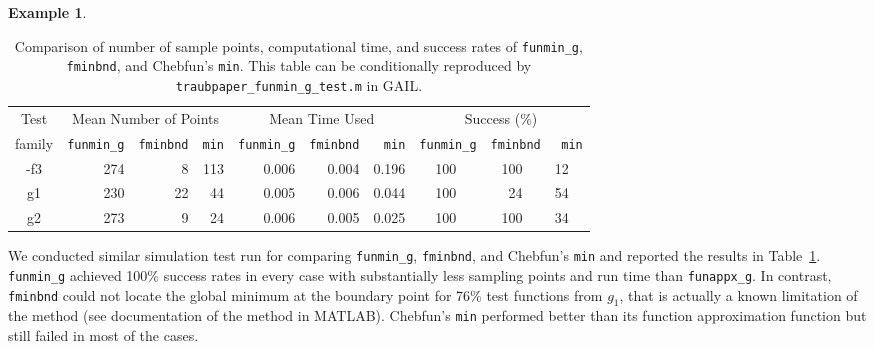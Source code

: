 \documentclass[review]{elsarticle}
\theoremstyle{definition}
\newtheorem{exmp}{Example}
\newcommand{\funappxg}{\texttt{funappx\_g}\xspace}
\newcommand{\funming}{\texttt{funmin\_g\xspace}}
\newcommand{\fminbnd}{\texttt{fminbnd\xspace}}
\begin{document}
\begin{exmp}
%
\begin{table}[tbh]
	\centering
	\caption{Comparison of number of sample points, computational time,  and success
		rates of \funming, \fminbnd, and
		Chebfun's \texttt{min}. 
		This table can be conditionally reproduced by
		\texttt{traubpaper\_funmin\_g\_test.m} in GAIL.}
	\label{tab:funmingVsfminbndVsChebfun}
	{\footnotesize
		\setlength{\tabcolsep}{.48em} %
		\begin{tabular}{|c|rrr|rrr|rrrrrr|}
			\hline
			Test      &     \multicolumn{3}{c|}{Mean Number of Points} & \multicolumn{3}{c|}{Mean Time Used}  & \multicolumn{6}{|c|}{Success (\%)}  
			\\  family &  \funming  &  \fminbnd    &  \texttt{min}    & \funming     &  \fminbnd  & \texttt{min}   & \multicolumn{2}{r}{\funming} & \multicolumn{2}{r}{\fminbnd} & \multicolumn{2}{r|}{\texttt{min}}   
			\\ \hline
			-f3   &  274   &   8   &   113    &   0.006   &    0.004    &  0.196  &    100   &  &  100   &   &  12 &
			\\ \phantom{-}g1   &  230   &  22   &    44    &   0.005   &    0.006    &  0.044  &    100   &  &   24   &   &  54 &      
			\\ \phantom{-}g2   &  273   &   9   &    24    &   0.006   &    0.005    &  0.025  &    100   &  &  100   &   &  34 &  
			\\ \hline
		\end{tabular}
	}
\end{table}
%

We conducted similar simulation test run for comparing \funming, \fminbnd, and
Chebfun's \texttt{min} and reported the results in
Table~\ref{tab:funmingVsfminbndVsChebfun}. \funming{} achieved 100\%
success rates in every case with substantially less sampling points and run time than \funappxg. 
In contrast, \fminbnd{} could not locate the global
minimum at the boundary point for 76\% test functions from $g_1$, that is actually a known
limitation of the method (see documentation of the method in MATLAB). Chebfun's  
{\tt min} performed better than its function approximation function but still failed in most of the cases.

\end{exmp}
\end{document}
